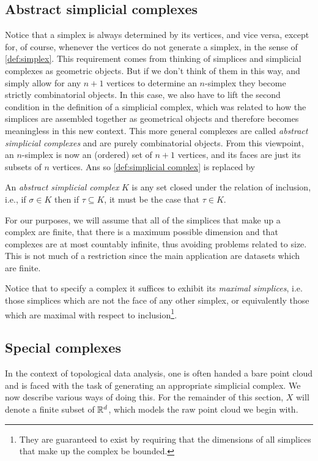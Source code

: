 \documentclass[../main.tex]{subfiles}
\begin{document}
\subsection{Abstract simplicial complexes}
Notice that a simplex is always determined by its vertices, and vice versa, except for, of
course, whenever the vertices do not generate a simplex, in the sense of
\cref{def:simplex}. This requirement comes from thinking of simplices and simplicial
complexes as geometric objects. But if we don't think of them in this way, and simply
allow for any \( n+1 \) vertices to determine an \( n \)-simplex they become strictly
combinatorial objects. In this case, we also have to lift the second condition in the
definition of a simplicial complex, which was related to how the simplices are assembled
together as geometrical objects and therefore becomes meaningless in this new context. This more
general complexes are called \emph{abstract simplicial complexes} and are purely
combinatorial objects. From this viewpoint, an \( n \)-simplex is now an (ordered) set of
\( n+1 \) vertices, and its faces are just its subsets of \( n \) vertices. 
Ans so \cref{def:simplicial complex} is replaced by
\begin{definition}
	An \emph{abstract simplicial complex} \( K \) is any set closed under the relation of
	inclusion, i.e., if \( \sigma \in K \) then if \( \tau \subseteq K \), it must be the
	case that \( \tau \in K \).  
\end{definition}
For our purposes, we will assume that all of the simplices that make up a complex are
finite, that there is a maximum possible dimension  and that complexes are at most
countably infinite, thus avoiding problems related to size. This is not much of a
restriction since the main application are datasets which are finite. 

Notice that to specify a complex it suffices to exhibit its \emph{maximal simplices}, i.e.
those simplices which are not the face of any other simplex, or equivalently those which
are maximal with respect to inclusion\footnote{They are guaranteed to exist by requiring that the
dimensions of all simplices that make up the complex be bounded.}.

\subsection{Special complexes}
In the context of topological data analysis, one is often handed a bare point cloud and is
faced with the task of generating an appropriate simplicial complex. We now describe
various ways of doing this.  For the remainder of this section, \( X \) will denote a
finite subset of \( \mathbb{R}^d \), which models the raw point cloud we begin with. 
\end{document}
